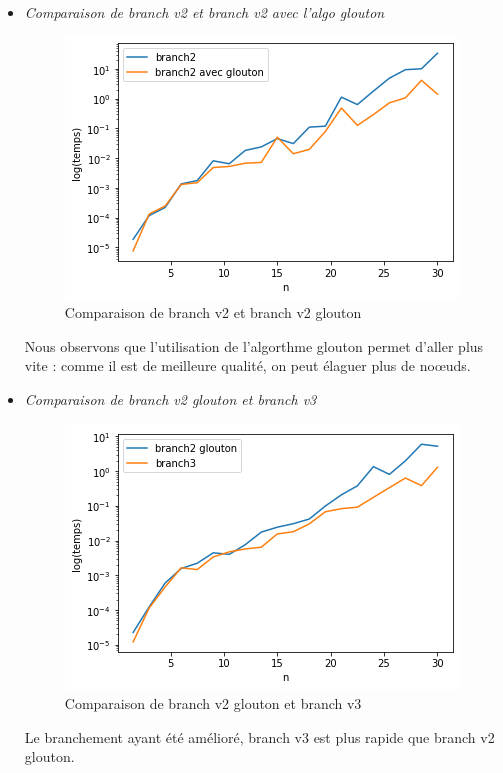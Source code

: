 \documentclass[12pt]{article}
\begin{document}
\begin{itemize}
            \item \textit{Comparaison de branch v2 et branch v2 avec l'algo glouton} \\
                \begin{figure}[h]
                    \caption{Comparaison de branch v2 et branch v2 glouton}
                    \includegraphics[scale=0.6]{figures/branch2-2glou.png}
                    \centering
                \end{figure}
                Nous observons que l'utilisation de l'algorthme glouton permet d'aller plus vite : comme il est de meilleure qualité, on peut élaguer plus de noœuds.

            \item \textit{Comparaison de branch v2 glouton et branch v3} \\
            \begin{figure}[h]
                \caption{Comparaison de branch v2 glouton et branch v3}
                \includegraphics[scale=0.6]{figures/branch2glou-3.png}
                \centering
            \end{figure}
            Le branchement ayant été amélioré, branch v3 est plus rapide que branch v2 glouton.


\end{itemize}
\end{document}
